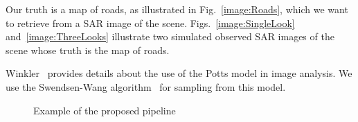 \documentclass[journal]{IEEEtran}
\begin{document}
Our truth is a map of roads, as illustrated in Fig.~\ref{image:Roads}, which we want to retrieve from a SAR image of the scene.
Figs.~\ref{image:SingleLook} and~\ref{image:ThreeLooks} illustrate two simulated observed SAR images of the scene whose truth is the map of roads.

Winkler~\cite{Winkler2006} provides details about the use of the Potts model in image analysis.
We use the Swendsen-Wang algorithm~\cite{SwendsenWang87} for sampling from this model.

\begin{figure}[hbt]
\centering
{}
\caption{Example of the proposed pipeline}\label{fig:Pipeline}
\end{figure}



\end{document}
